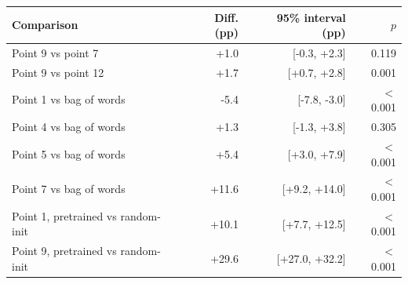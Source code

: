 \begin{tabular}{lrrr}
\toprule
Comparison & Diff. (pp) & 95\% interval (pp) & $p$ \\
\midrule
Point 9 vs point 7 & +1.0 & [-0.3, +2.3] & 0.119 \\
Point 9 vs point 12 & +1.7 & [+0.7, +2.8] & 0.001 \\
Point 1 vs bag of words & -5.4 & [-7.8, -3.0] & $<$0.001 \\
Point 4 vs bag of words & +1.3 & [-1.3, +3.8] & 0.305 \\
Point 5 vs bag of words & +5.4 & [+3.0, +7.9] & $<$0.001 \\
Point 7 vs bag of words & +11.6 & [+9.2, +14.0] & $<$0.001 \\
Point 1, pretrained vs random-init & +10.1 & [+7.7, +12.5] & $<$0.001 \\
Point 9, pretrained vs random-init & +29.6 & [+27.0, +32.2] & $<$0.001 \\
\bottomrule
\end{tabular}